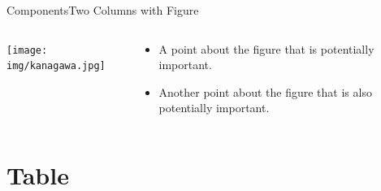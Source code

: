 \documentclass[aspectratio=169,t]{beamer}
\begin{document}
\begin{frame}{Components}{Two Columns with Figure}
  \begin{columns}[T]
  \vspace{0pt}
  \begin{column}{.5\textwidth}
    \texttt{[image: img/kanagawa.jpg]}
  \end{column}
  \hfill
  \begin{column}{.48\textwidth}
    \begin{itemize}
    \item A point about the figure that is potentially important.
    \item Another point about the figure that is also potentially important.
    \end{itemize}
  \end{column}
  \end{columns}
\end{frame}

\section{Table}
\end{document}
